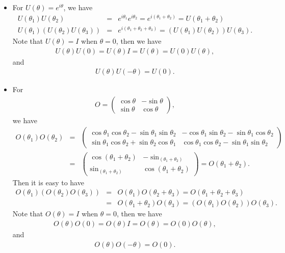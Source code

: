 \documentclass[11pt]{article}
\begin{document}
\section{ }
\begin{itemize}
  \item For $U(\theta)=e^{i \theta}$, we have
  \begin{eqnarray}
    U(\theta_1) U(\theta_2) &=&e^{i \theta_1} e^{i \theta_2} =e^{i (\theta_1+\theta_2)}=U(\theta_1+\theta_2) \nonumber \\
    U(\theta_1) (U(\theta_2) U(\theta_3)) &=& e^{i (\theta_1+\theta_2+\theta_3)}= (U(\theta_1) U(\theta_2)) U(\theta_3).
  \end{eqnarray}
  Note that $U(\theta)=I$ when $\theta=0$, then we have
  \begin{eqnarray}
    U(\theta) U(0)=U(\theta) I= U(\theta) = U(0) U(\theta),
  \end{eqnarray}
  and
  \begin{eqnarray}
    U(\theta) U(- \theta)=U (0).
  \end{eqnarray}
  \item For
  \begin{eqnarray}
    O=
    \begin{pmatrix}
      \cos \theta & -\sin \theta\\
      \sin \theta&\cos \theta
    \end{pmatrix},
  \end{eqnarray}
  we have
  \begin{eqnarray}
    O(\theta_1) O(\theta_2) &=&
    \begin{pmatrix}
      \cos \theta_1 \cos \theta_2-\sin \theta_1 \sin\theta_2 & -\cos\theta_1 \sin\theta_2-\sin\theta_1 \cos\theta_2\\
      \sin\theta_1 \cos\theta_2+\sin \theta_2\cos\theta_1 &
      \cos\theta_1\cos \theta_2-\sin\theta_1\sin\theta_2
    \end{pmatrix}\\
    &=&
    \begin{pmatrix}
      \cos(\theta_1+\theta_2)&-\sin_(\theta_1+\theta_2) \\
      \sin_(\theta_1+\theta_2) & \cos(\theta_1+\theta_2)
    \end{pmatrix}=O(\theta_1+\theta_2).
  \end{eqnarray}
  Then it is easy to have
  \begin{eqnarray}
    O(\theta_1) (O(\theta_2) O(\theta_3))&=&O(\theta_1)O(\theta_2+\theta_3)= O(\theta_1+\theta_2+\theta_3)\\
    &=& O(\theta_1+ \theta_2)O(\theta_3)=(O(\theta_1) O(\theta_2)) O(\theta_3).
  \end{eqnarray}
  Note that $O(\theta)=I$ when $\theta=0$, then we have
  \begin{eqnarray}
    O(\theta) O(0)=O(\theta) I= O(\theta) = O(0) O(\theta),
  \end{eqnarray}
  and
  \begin{eqnarray}
    O(\theta) O(- \theta)=O (0).
  \end{eqnarray}
  

\end{itemize}
\end{document}
